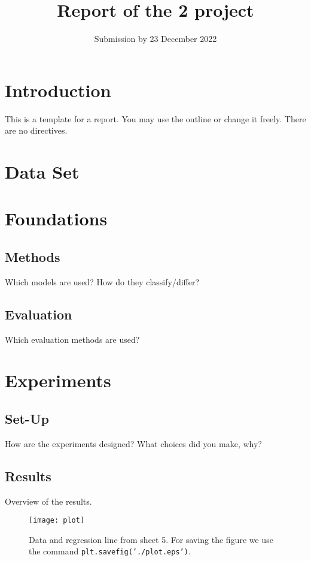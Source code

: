 \documentclass[a4paper,12pt]{article}
\title{Report of the 2\ts{nd} project}
\date{Submission by 23\ts{st} December 2022}
\begin{document}

    
\maketitle


\section{Introduction}
This is a template for a report. You may use the outline or change it freely. There are no directives.

\section{Data Set}

\section{Foundations}

\subsection{Methods}
Which models are used? How do they classify/differ? 

\subsection{Evaluation}
Which evaluation methods are used?

\section{Experiments}

\subsection{Set-Up}
How are the experiments designed? What choices did you make, why?

\subsection{Results}
Overview of the results.


\begin{figure}[h]
\centering
\texttt{[image: plot]}
\caption{Data and regression line from sheet 5. For saving the figure we use the command \texttt{plt.savefig('./plot.eps')}.}
\label{fig_res}
\end{figure}
\end{document}
